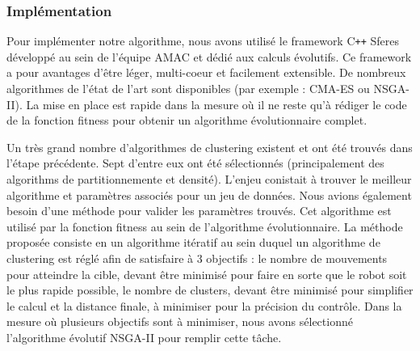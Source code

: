 \documentclass{llncs}
\newcommand*\circled[1]{\tikz[baseline=(char.base)]{
            \node[shape=circle,draw,inner sep=2pt] (char) {#1};}}
\begin{document}





\subsubsection{Implémentation}
Pour implémenter notre algorithme, nous avons utilisé le framework C{}\verb!++! Sferes \cite{Mouret2010} développé au sein de l'équipe AMAC et dédié aux calculs évolutifs. Ce framework a pour avantages d'être léger, multi-coeur et facilement extensible. De nombreux algorithmes de l'état de l'art sont disponibles (par exemple : CMA-ES ou NSGA-II). La mise en place est rapide dans la mesure où il ne reste qu'à rédiger le code de la fonction fitness pour obtenir un algorithme évolutionnaire complet.

Un très grand nombre d'algorithmes de clustering existent et ont été trouvés dans l'étape précédente. Sept d'entre eux ont été sélectionnés (principalement des algorithms de partitionnemente et densité). L'enjeu conistait à trouver le meilleur algorithme et paramètres associés pour un jeu de données. Nous avions également besoin d'une méthode pour valider les paramètres trouvés. Cet algorithme est utilisé par la fonction fitness au sein de l'algorithme évolutionnaire. La méthode proposée consiste en un algorithme itératif au sein duquel un algorithme de clustering est réglé afin de satisfaire à 3 objectifs : \circled{1} le nombre de mouvements pour atteindre la cible, devant être minimisé pour faire en sorte que le robot soit le plus rapide possible, \circled{2} le nombre de clusters, devant être minimisé pour simplifier le calcul et \circled{3} la distance finale, à minimiser pour la précision du contrôle. Dans la mesure où plusieurs objectifs sont à minimiser, nous avons sélectionné l'algorithme évolutif NSGA-II\cite{Deb:2002:FEM:2221359.2221582} pour remplir cette tâche.
\end{document}

